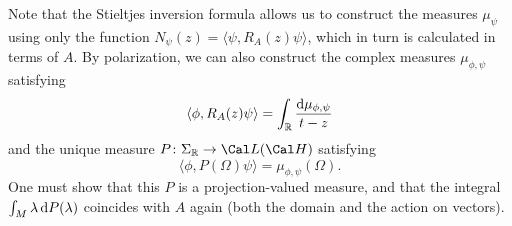 Note that the Stieltjes inversion formula allows us to construct the
measures \(\mu_\psi\) using only the function
\(N_\psi(z)=\langle\psi,R_A(z)\psi\rangle\), which in turn is
calculated in terms of \(A\).
By polarization, we can also construct the complex measures
\(\mu_{\phi,\psi}\) satisfying
\begin{equation}
  \langle \phi,R_A(z)\psi\rangle
  =
  \int_{\mathbb{R}}^{}\frac{\mathop{}\!\mathrm{d}\mu_{\phi,\psi}}{t-z}
\end{equation}
and the unique measure \(P\colon\Sigma_\R\to\Cal L(\Cal H)\) satisfying
\begin{equation}
  \langle \phi, P(\Omega)\psi\rangle = \mu_{\phi,\psi}(\Omega).
\end{equation}
One must show that this \(P\) is a projection-valued measure,
and that the integral \(\int_{M}^{}\lambda\mathop{}\!\mathrm{d} P(\lambda)\) coincides
with \(A\) again (both the domain and the action on vectors).


